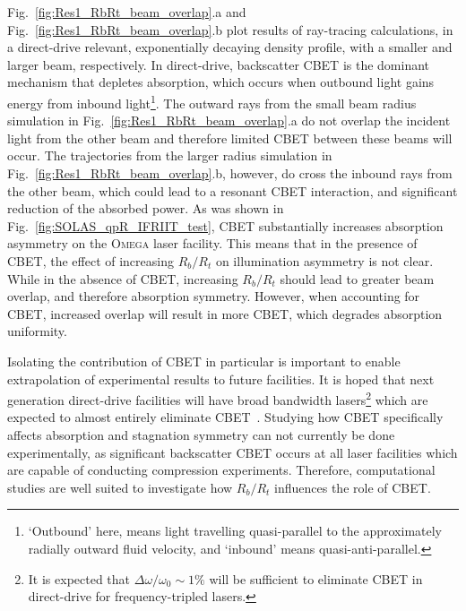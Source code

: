 Fig.~\ref{fig:Res1_RbRt_beam_overlap}.a and Fig.~\ref{fig:Res1_RbRt_beam_overlap}.b plot results of ray-tracing calculations, in a direct-drive relevant, exponentially decaying density profile, with a smaller and larger beam, respectively.
In direct-drive, backscatter \ac{CBET} is the dominant mechanism that depletes absorption, which occurs when outbound light gains energy from inbound light\footnote{`Outbound' here, means light travelling quasi-parallel to the approximately radially outward fluid velocity, and `inbound' means quasi-anti-parallel.}.
The outward rays from the small beam radius simulation in Fig.~\ref{fig:Res1_RbRt_beam_overlap}.a do not overlap the incident light from the other beam and therefore limited \ac{CBET} between these beams will occur.
The trajectories from the larger radius simulation in Fig.~\ref{fig:Res1_RbRt_beam_overlap}.b, however, do cross the inbound rays from the other beam, which could lead to a resonant \ac{CBET} interaction, and significant reduction of the absorbed power.
As was shown in Fig.~\ref{fig:SOLAS_qpR_IFRIIT_test}, \ac{CBET} substantially increases absorption asymmetry on the \textsc{Omega} laser facility.
This means that in the presence of \ac{CBET}, the effect of increasing $R_b/R_t$ on illumination asymmetry is not clear.
While in the absence of \ac{CBET}, increasing $R_b/R_t$ should lead to greater beam overlap, and therefore absorption symmetry.
However, when accounting for \ac{CBET}, increased overlap will result in more \ac{CBET}, which degrades absorption uniformity.

Isolating the contribution of \ac{CBET} in particular is important to enable extrapolation of experimental results to future facilities.
It is hoped that next generation direct-drive facilities will have broad bandwidth lasers\footnote{It is expected that $\Delta\omega/\omega_0\sim1\%$ will be sufficient to eliminate \ac{CBET} in direct-drive for frequency-tripled lasers.} which are expected to almost entirely eliminate \ac{CBET}~\cite{bates_mitigation_2018,bates_suppressing_2023,follett_raybased_2023}.
Studying how \ac{CBET} specifically affects absorption and stagnation symmetry can not currently be done experimentally, as significant backscatter \ac{CBET} occurs at all laser facilities which are capable of conducting compression experiments.
Therefore, computational studies are well suited to investigate how $R_b/R_t$ influences the role of \ac{CBET}.

